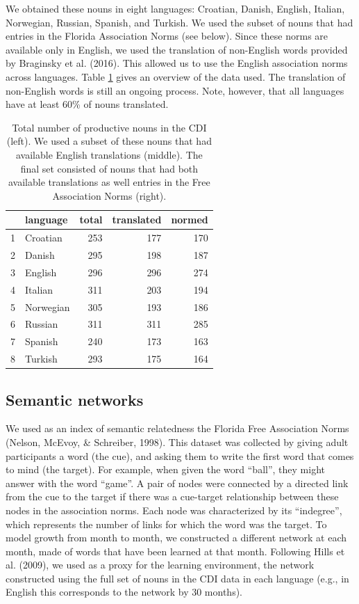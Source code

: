 \documentclass[10pt, letterpaper]{article}
\begin{document}
We obtained these nouns in eight languages: Croatian, Danish, English,
Italian, Norwegian, Russian, Spanish, and Turkish. We used the subset of
nouns that had entries in the Florida Association Norms (see below).
Since these norms are available only in English, we used the translation
of non-English words provided by Braginsky et al. (2016). This allowed
us to use the English association norms across languages. Table
\ref{tab:stats} gives an overview of the data used. The translation of
non-English words is still an ongoing process. Note, however, that all
languages have at least 60\% of nouns translated.

\begin{table}[H]
\centering
\begin{tabular}{rlrrr}
  \hline
 & language & total & translated & normed \\ 
  \hline
1 & Croatian & 253 & 177 & 170 \\ 
  2 & Danish & 295 & 198 & 187 \\ 
  3 & English & 296 & 296 & 274 \\ 
  4 & Italian & 311 & 203 & 194 \\ 
  5 & Norwegian & 305 & 193 & 186 \\ 
  6 & Russian & 311 & 311 & 285 \\ 
  7 & Spanish & 240 & 173 & 163 \\ 
  8 & Turkish & 293 & 175 & 164 \\ 
   \hline
\end{tabular}
\caption{\label{tab:stats}Total number of productive nouns in the CDI (left). We used a subset of these nouns that had available English translations (middle). The final set consisted of nouns that had both available translations as well entries in the Free Association Norms (right).} 
\end{table}

\subsection{Semantic networks}\label{semantic-networks}

We used as an index of semantic relatedness the Florida Free Association
Norms (Nelson, McEvoy, \& Schreiber, 1998). This dataset was collected
by giving adult participants a word (the cue), and asking them to write
the first word that comes to mind (the target). For example, when given
the word ``ball'', they might answer with the word ``game''. A pair of
nodes were connected by a directed link from the cue to the target if
there was a cue-target relationship between these nodes in the
association norms. Each node was characterized by its ``indegree'',
which represents the number of links for which the word was the target.
To model growth from month to month, we constructed a different network
at each month, made of words that have been learned at that month.
Following Hills et al. (2009), we used as a proxy for the learning
environment, the network constructed using the full set of nouns in the
CDI data in each language (e.g., in English this corresponds to the
network by 30 months).
\end{document}
